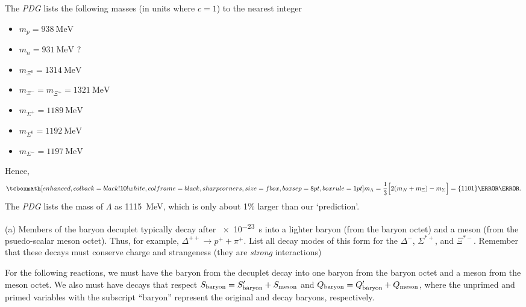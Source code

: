 
The \textit{PDG} lists the following masses (in units where $c = 1$) to the nearest integer
\begin{itemize}
    \item $m_{p} = \qty{938}{\MeV}$
    \item $m_{n} = \qty{931}{\MeV}$ ?
    \item $m_{\Xi^{0}} = \qty{1314}{\MeV}$
    \item $m_{\Xi^{-}} = m_{\Xi^{+}} = \qty{1321}{\MeV}$
    \item $m_{\Sigma^{+}} = \qty{1189}{\MeV}$
    \item $m_{\Sigma^{0}} = \qty{1192}{\MeV}$
    \item $m_{\Sigma^{-}} = \qty{1197}{\MeV}$
\end{itemize}
Hence,
\begin{eqnarray}
    \label{eq:mass-Lambda}
    \eqbox{
    m_{\Lambda} = \frac{1}{3}\Bigl[ 2(m_{N} + m_{\Xi}) - m_{\Sigma} \Bigr] = \qty{1101}{\mega\eV} 
}
.\end{eqnarray}
The \textit{PDG} lists the mass of $\Lambda$ as \qty{1115}{\mega\eV}, which is only about 1\% larger than our `prediction'.



(a) Members of the baryon decuplet typically decay after \qty{e-23}{\s} into a lighter baryon (from the baryon octet) and a meson (from the psuedo-scalar meson octet).
Thus, for example, $\Delta^{++} \rightarrow p^{+} + \pi^{+}$.
List all decay modes of this form for the $\Delta^{-}$, $\Sigma^{*+}$, and $\Xi^{*-}$.
Remember that these decays must conserve charge and strangeness (they are \textit{strong} interactions)

For the following reactions, we must have the baryon from the decuplet decay into one baryon from the baryon octet and a meson from the meson octet.
We also must have decays that respect $S_{\rm baryon} = S'_{\rm baryon} + S_{\rm meson}$ and $Q_{\rm baryon} = Q'_{\rm baryon} + Q_{\rm meson}$, where the unprimed and primed variables with the subscript ``baryon'' represent the original and decay baryons, respectively.


